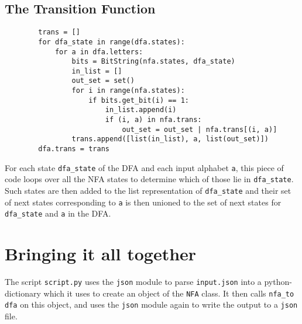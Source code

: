 \documentclass[12pt]{scrreprt}
\begin{document}
    \subsection*{The Transition Function}

    \begin{verbatim}
        trans = []
        for dfa_state in range(dfa.states):
            for a in dfa.letters:
                bits = BitString(nfa.states, dfa_state)
                in_list = []
                out_set = set()
                for i in range(nfa.states):
                    if bits.get_bit(i) == 1:
                        in_list.append(i)
                        if (i, a) in nfa.trans:
                            out_set = out_set | nfa.trans[(i, a)]
                trans.append([list(in_list), a, list(out_set)])
        dfa.trans = trans
    \end{verbatim}
    For each state \texttt{dfa_state} of the DFA and each input alphabet \texttt{a}, this piece of code loops over all the NFA states to determine which of those lie in \texttt{dfa_state}. Such states are then added to the list representation of \texttt{dfa_state} and their set of next states corresponding to \texttt{a} is then unioned to the set of next states for \texttt{dfa_state} and \texttt{a} in the DFA.

    \section{Bringing it all together}
    The script \texttt{script.py} uses the \texttt{json} module to parse \texttt{input.json} into a python-dictionary which it uses to create an object of the \texttt{NFA} class. It then calls  \texttt{nfa_to dfa} on this object, and uses the \texttt{json} module again to write the output to a \texttt{json} file.
\end{document}
